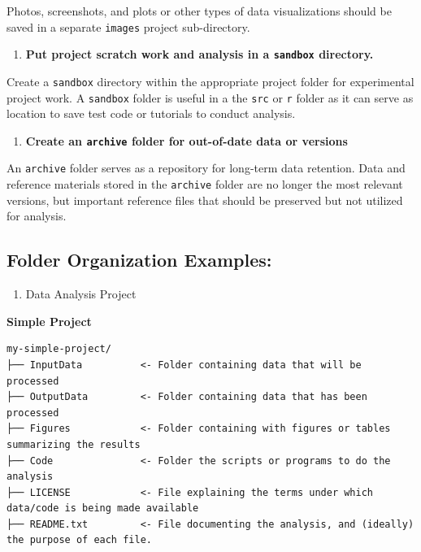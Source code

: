 \documentclass[
]{book}
\providecommand{\tightlist}{%
  \setlength{\itemsep}{0pt}\setlength{\parskip}{0pt}}
\begin{document}
Photos, screenshots, and plots or other types of data visualizations should be saved in a separate \texttt{images} project sub-directory.

\begin{enumerate}
\def\labelenumi{\arabic{enumi}.}
\setcounter{enumi}{5}
\tightlist
\item
  \textbf{Put project scratch work and analysis in a \texttt{sandbox} directory.}
\end{enumerate}

Create a \texttt{sandbox} directory within the appropriate project folder for experimental project work. A \texttt{sandbox} folder is useful in a the \texttt{src} or \texttt{r} folder as it can serve as location to save test code or tutorials to conduct analysis.

\begin{enumerate}
\def\labelenumi{\arabic{enumi}.}
\setcounter{enumi}{6}
\tightlist
\item
  \textbf{Create an \texttt{archive} folder for out-of-date data or versions}
\end{enumerate}

An \texttt{archive} folder serves as a repository for long-term data retention. Data and reference materials stored in the \texttt{archive} folder are no longer the most relevant versions, but important reference files that should be preserved but not utilized for analysis.

\hypertarget{folder-organization-examples}{%
\subsection{Folder Organization Examples:}\label{folder-organization-examples}}

\begin{enumerate}
\def\labelenumi{\arabic{enumi})}
\tightlist
\item
  Data Analysis Project
\end{enumerate}

\textbf{Simple Project}

\begin{verbatim}
my-simple-project/
├── InputData          <- Folder containing data that will be processed
├── OutputData         <- Folder containing data that has been processed
├── Figures            <- Folder containing with figures or tables summarizing the results
├── Code               <- Folder the scripts or programs to do the analysis
├── LICENSE            <- File explaining the terms under which data/code is being made available
├── README.txt         <- File documenting the analysis, and (ideally) the purpose of each file.
\end{verbatim}
\end{document}
